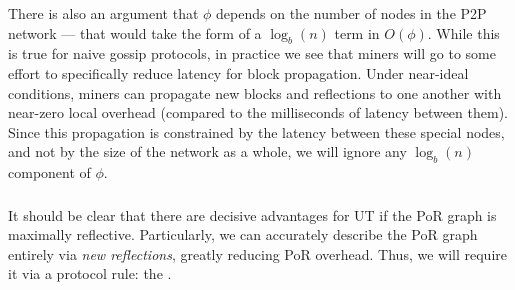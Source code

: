 There is also an argument that $\phi$ depends on the number of nodes in the P2P network --- that would take the form of a $\log_b(n)$ term in $O(\phi)$.
While this is true for naive gossip protocols, in practice we see that miners will go to some effort to specifically reduce latency for block propagation.
Under near-ideal conditions, miners can propagate new blocks and reflections to one another with near-zero local overhead (compared to the milliseconds of latency between them).
Since this propagation is constrained by the latency between these special nodes, and not by the size of the network as a whole, we will ignore any $\log_b(n)$ component of $\phi$.



\subsubsection{\AxiomOfRawMaximalReflection}

It should be clear that there are decisive advantages for UT if the PoR graph is maximally reflective.
Particularly, we can accurately describe the PoR graph entirely via \emph{new reflections}, greatly reducing PoR overhead.
Thus, we will require it via a protocol rule: the \AxiomOfMaximalReflection.


